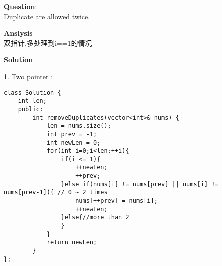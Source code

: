 \begin{description}
    \item{\textbf{Question}}:\\%
		Duplicate are allowed twice.

    \item{\textbf{Anslysis}}\\
		双指针,多处理到i==1的情况\\

    \item{\textbf{Solution}}\\
	\item{1. Two pointer} : \\
		\begin{lstlisting}
class Solution {
	int len;
	public:
		int removeDuplicates(vector<int>& nums) {
			len = nums.size();
			int prev = -1;
			int newLen = 0;
			for(int i=0;i<len;++i){
				if(i <= 1){
					++newLen;
					++prev;
				}else if(nums[i] != nums[prev] || nums[i] != nums[prev-1]){ // 0 ~ 2 times
					nums[++prev] = nums[i];
					++newLen;
				}else{//more than 2
				}
			}
			return newLen;
		}
};
		\end{lstlisting}
\end{description}

